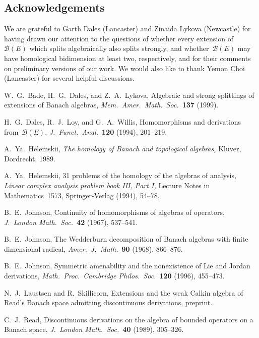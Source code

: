 \documentclass[11pt,reqno]{amsart}
\theoremstyle{definition}
\numberwithin{equation}{section}
\begin{document}
\subsection*{Acknowledgements} We are grateful to 
Garth Dales (Lancaster) and Zinaida Lykova (Newcastle) for having
drawn our attention to the questions of whether every extension
of~$\mathscr{B}(E)$ which splits algebraically also splits strongly,
and whether~$\mathscr{B}(E)$ may have homological bidimension at least
two, respectively, and for their comments on preliminary versions of
our work. We would also like to thank Yemon Choi (Lancaster) for
several helpful discussions.


\begin{thebibliography}{99}

 W.~G.~Bade, H.~G.~Dales, and Z.~A.~Lykova, Algebraic and
  strong splittings of extensions of Banach algebras, \emph{Mem.\
    Amer.\ Math.\ Soc.}~\textbf{137} (1999).

 H.~G.~Dales, R.~J.~Loy, and G.~A.~Willis, Homomorphisms
  and derivations from~$\mathscr{B}(E)$,
  \emph{J.~Funct.\ Anal.}~\textbf{120} (1994), 201--219.

 A.~Ya.~Helemskii, \emph{The homology of Banach and
  topological algebras,} Kluver, Dordrecht, 1989.

  A.~Ya.~Helemskii, 31 problems of the homology of
  the algebras of analysis, \emph{Linear complex analysis problem book
    III, Part I,} Lecture Notes in Mathematics~1573, Springer-Verlag
  (1994), 54--78.

 B.~E.~Johnson, Continuity of homomorphisms of
  algebras of operators, \emph{J.~London Math.\ Soc.}~\textbf{42}
  (1967), 537--541.

 B.~E.~Johnson, The Wedderburn decomposition of
  Banach algebras with finite dimensional radical,
  \emph{Amer.\ J.~Math.}~\textbf{90} (1968), 866--876.

 B.~E.~Johnson, Symmetric amenability and the
  nonexistence of Lie and Jordan derivations,
  \emph{Math.\ Proc.\ Cambridge Philos.\ Soc.}~\textbf{120} (1996),
  455--473.

 N.~J.~Laustsen and R.~Skillicorn,  Extensions and the
  weak Calkin algebra of Read's   Banach space admitting discontinuous
  derivations, preprint.%

  C.~J.~Read, Discontinuous derivations on the 
algebra of bounded operators on a Banach space, \emph{J.~London 
Math.\ Soc.}~\textbf{40} (1989), 305--326.

\end{thebibliography}
\end{document}
